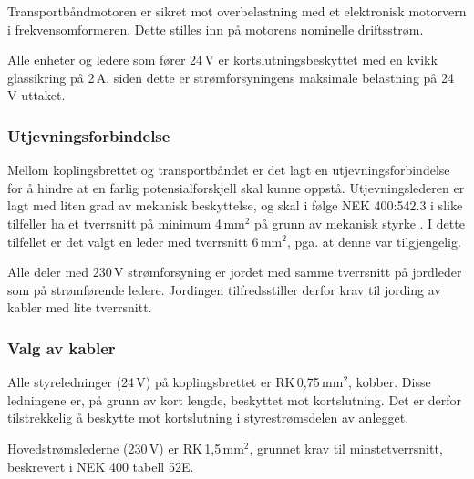 \documentclass[Visionprosjekt.tex]{subfiles}
\begin{document}
Transportbåndmotoren er sikret mot overbelastning med et elektronisk motorvern i frekvensomformeren. Dette stilles inn på motorens nominelle driftsstrøm. %


Alle enheter og ledere som fører  24\,V er kortslutningsbeskyttet med en kvikk glassikring på 2\,A, siden dette er strømforsyningens maksimale belastning på 24\,V-uttaket. %




\subsubsection{Utjevningsforbindelse}

Mellom  koplingsbrettet og transportbåndet er det lagt en  utjevningsforbindelse  for å hindre at en farlig potensialforskjell skal kunne oppstå.   
Utjevningslederen er lagt med liten grad av mekanisk beskyttelse, og skal i følge NEK 400:542.3 i slike tilfeller ha et tverrsnitt på minimum  4\,mm$^2$ på grunn av mekanisk styrke \cite{NEK400}. I dette tilfellet er det valgt en leder med tverrsnitt 6\,mm$^2$, pga. at denne var tilgjengelig.

Alle deler med 230\,V strømforsyning er jordet med samme tverrsnitt på jordleder som på strømførende ledere. Jordingen tilfredsstiller derfor krav til jording av kabler med lite tverrsnitt. \cite{NEK400}



\subsubsection{Valg av kabler}

Alle styreledninger (24\,V) på koplingsbrettet er RK\,0,75\,mm$^2$, kobber. Disse ledningene er, på grunn av kort lengde, beskyttet mot kortslutning. 
Det er derfor tilstrekkelig å beskytte mot kortslutning i styrestrømsdelen av anlegget. 

Hovedstrømslederne (230\,V)  er RK\,1,5\,mm$^2$, grunnet krav til minstetverrsnitt, beskrevert i NEK 400 tabell 52E. %

\end{document}
